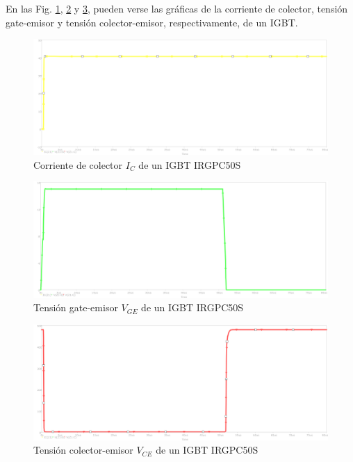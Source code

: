 \documentclass[conference]{IEEEtran}
\begin{document}
En las Fig. \ref{fig:ic_igbt}, \ref{fig:vge_igbt} y \ref{fig:vce_igbt}, pueden verse las gráficas de la corriente de colector, tensión gate-emisor y tensión colector-emisor, respectivamente, de un IGBT.


\begin{figure}[H]
	\centering
	\includegraphics[width=\columnwidth]{imagenes/ic_igbt}
	\caption{Corriente de colector $I_C$ de un IGBT IRGPC50S}
	\label{fig:ic_igbt}
\end{figure}

\begin{figure}[H]
	\centering
	\includegraphics[width=\columnwidth]{imagenes/vge_igbt}
	\caption{Tensión gate-emisor $V_{GE}$ de un IGBT IRGPC50S}
	\label{fig:vge_igbt}
\end{figure}

\begin{figure}[H]
	\centering
	\includegraphics[width=\columnwidth]{imagenes/vce_igbt}
	\caption{Tensión colector-emisor $V_{CE}$ de un IGBT IRGPC50S}
	\label{fig:vce_igbt}
\end{figure}
\end{document}
